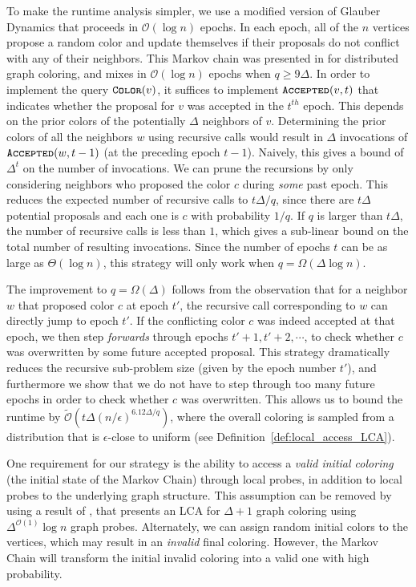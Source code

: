 To make the runtime analysis simpler, we use a modified version of Glauber Dynamics that proceeds in $\mathcal O(\log n)$ epochs.
In each epoch, all of the $n$ vertices propose a random color and update themselves if their proposals do not conflict with any of their neighbors.
This Markov chain was presented in \cite{what_local} for distributed graph coloring, and mixes in $\mathcal O(\log n)$ epochs when $q\ge 9\Delta$.
In order to implement the query $\texttt{\textsc{Color}}(v)$, it suffices to implement $\texttt{\textsc{Accepted}}(v,t)$
that indicates whether the proposal for $v$ was accepted in the $t^{th}$ epoch.
This depends on the prior colors of the potentially $\Delta$ neighbors of $v$.
Determining the prior colors of all the neighbors $w$ using recursive calls would result in
$\Delta$ invocations of $\texttt{\textsc{Accepted}}(w, t-1)$ (at the preceding epoch $t-1$).
Naively, this gives a bound of $\Delta^t$ on the number of invocations.
We can prune the recursions by only considering neighbors who proposed the color $c$ during \emph{some} past epoch.
This reduces the expected number of recursive calls to $t\Delta/q$,
since there are $t\Delta$ potential proposals and each one is $c$ with probability $1/q$.
If $q$ is larger than $t\Delta$, the number of recursive calls is less than $1$,
which gives a sub-linear bound on the total number of resulting invocations.
Since the number of epochs $t$ can be as large as $\Theta(\log n)$, this strategy will only work when $q = \Omega(\Delta\log n)$.

The improvement to $q = \Omega(\Delta)$ follows from the observation that for a neighbor $w$ that proposed color $c$ at epoch $t'$,
the recursive call corresponding to $w$ can directly jump to epoch $t'$.
If the conflicting color $c$ was indeed accepted at that epoch,
we then step \emph{forwards} through epochs $t'+1, t'+2,\cdots$, to check whether $c$ was overwritten by some future accepted proposal.
This strategy dramatically reduces the recursive sub-problem size (given by the epoch number $t'$),
and furthermore we show that we do not have to step through too many future epochs in order to check whether $c$ was overwritten.
This allows us to bound the runtime by $\widetilde{\mathcal O}\left(t\Delta (n/\epsilon)^{6.12\Delta/q}\right)$,
where the overall coloring is sampled from a distribution that is $\epsilon$-close to uniform (see Definition~\ref{def:local_access_LCA}).

One requirement for our strategy is the ability to access a \emph{valid initial coloring} (the initial state of the Markov Chain)
through local probes, in addition to local probes to the underlying graph structure.
This assumption can be removed by using a result of \cite{coloring_initialize},
that presents an LCA for $\Delta+1$ graph coloring using $\Delta^{\mathcal O(1)}\log n$ graph probes.
Alternately, we can assign random initial colors to the vertices, which may result in an \emph{invalid} final coloring.
However, the Markov Chain will transform the initial invalid coloring into a valid one with high probability.

